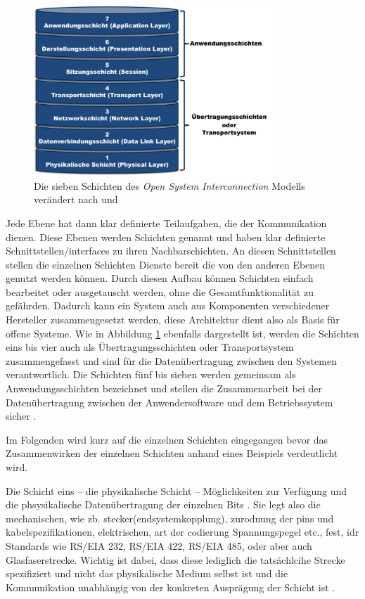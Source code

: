 \begin{figure}
\centering
\includegraphics[width=0.8\textwidth]{abbildungen/20160112_osi}
\caption[Die sieben Schichten des Open System Interconnection Modells]{Die sieben Schichten des \textit{Open System Interconnection} Modells verändert nach \cite[S.~10]{schn06} und \cite[S.~28]{osi96}}
\label{fig:osi}
\end{figure}

Jede Ebene hat dann klar definierte Teilaufgaben, die der Kommunikation dienen. Diese Ebenen werden Schichten genannt und haben klar definierte Schnittstellen/interfaces zu ihren Nachbarschichten. An diesen Schnittstellen stellen die einzelnen Schichten Dienste bereit die von den anderen Ebenen genutzt werden können. Durch diesen Aufbau können Schichten einfach bearbeitet oder ausgetauscht werden, ohne die Gesamtfunktionalität zu gefährden. Dadurch kann ein System auch aus Komponenten verschiedener Hersteller zusammengesetzt werden, diese Architektur dient also als Basis für offene Systeme. Wie in Abbildung \ref{fig:osi} ebenfalls dargestellt ist, werden die Schichten eins bis vier auch als Übertragungsschichten oder Transportsystem zusammengefasst und sind für die Datenübertragung zwischen den Systemen verantwortlich. Die Schichten fünf bis sieben werden gemeinsam als Anwendungsschichten bezeichnet und stellen die Zusammenarbeit bei der Datenübertragung zwischen der Anwendersoftware und dem Betriebssystem sicher \cite[S.~8f.]{schn06}.

Im Folgenden wird kurz auf die einzelnen Schichten eingegangen bevor das Zusammenwirken der einzelnen Schichten anhand eines Beispiels verdeutlicht wird.

Die Schicht eins -- die physikalische Schicht -- Möglichkeiten zur Verfügung und die phsysikalische Datenübertragung der einzelnen Bits \cite[S.~49f.]{osi96}. Sie legt also die mechanischen, wie zb. stecker(endsystemkopplung), zurodnung der pins und kabelspezifikationen, elektrischen, art der codierung Spannungspegel etc., fest, idr Standards wie RS/EIA 232, RS/EIA 422, RS/EIA 485, oder aber auch Glasfaserstrecke. Wichtig ist dabei, dass diese lediglich die tatsächlcihe Strecke spezifiziert und nicht das physikalische Medium selbst ist und die Kommunikation unabhängig von der konkreten Ausprägung der Schicht ist \cite[S.~9]{schn06}.

